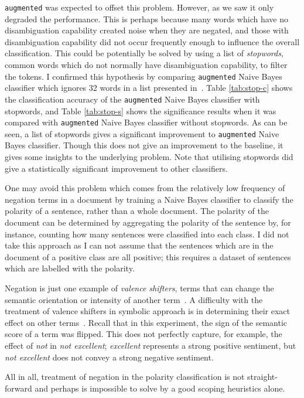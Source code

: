 \texttt{augmented} was expected to offset this problem. However, as we saw it only degraded the performance. This is perhaps because many words which have no disambiguation capability created noise when they are negated, and those with disambiguation capability did not occur frequently enough to influence the overall classification. This could be potentially be solved by using a list of \emph{stopwords}, common words which do not normally have disambiguation capability, to filter the tokens. I confirmed this hypothesis by comparing \texttt{augmented} Naive Bayes classifier which ignores 32 words in a list presented in~\citep{stopwords}.  Table \ref{tab:stop-c} shows the classification accuracy of the \texttt{augmented} Naive Bayes classifier with stopwords, and Table \ref{tab:stop-s} shows the significance results when it was compared with \texttt{augmented} Naive Bayes classifier without stopwords. As can be seen, a list of stopwords gives a significant improvement to \texttt{augmented} Naive Bayes classifier. Though this does not give an improvement to the baseline, it gives some insights to the underlying problem. Note that utilising stopwords did give a statistically significant improvement to other classifiers.

One may avoid this problem which comes from the relatively low frequency of negation terms in a document by training a Naive Bayes classifier to classify the polarity of a sentence, rather than a whole document. The polarity of the document can be determined by aggregating the polarity of the sentence by, for instance, counting how many sentences were classified into each class. I did not take this approach as I can not assume that the sentences which are in the document of a positive class are all positive; this requires a dataset of sentences which are labelled with the polarity.

Negation is just one example of \emph{valence shifters}, terms that can change the semantic orientation or intensity of another term~\citep{kennedy2006sentiment}. A difficulty with the treatment of valence shifters in symbolic approach is in determining their exact effect on other terms~\citep{kennedy2006sentiment}. Recall that in this experiment, the sign of the semantic score of a term was flipped. This does not perfectly capture, for example, the effect of \textit{not} in \textit{not excellent}; \textit{excellent} represents a strong positive sentiment, but \textit{not excellent} does not convey a strong negative sentiment.

All in all, treatment of negation in the polarity classification is not straight-forward and perhaps is impossible to solve by a good scoping heuristics alone. 

